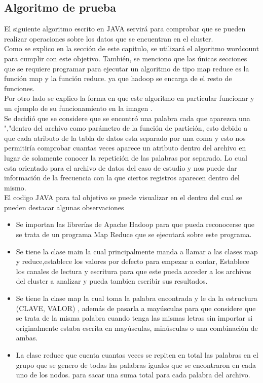 \subsection{Algoritmo de prueba} \label{seccion6}
El siguiente algoritmo escrito en JAVA servirá para comprobar que se pueden realizar operaciones sobre los datos
que se encuentran en el cluster.
\\
Como se explico en la sección  de este capitulo, se utilizará el algoritmo wordcount para cumplir con este objetivo.
También, se menciono que las únicas secciones que se requiere programar para ejecutar un algoritmo de tipo map
reduce es la función map y la función reduce. ya que hadoop se encarga de el resto de funciones.
\\
Por otro lado se explico la forma en que este algoritmo en particular funcionar y un ejemplo de su funcionamiento en
la imagen .
\\
Se decidió que se considere que se encontró una palabra cada que aparezca una ","dentro del archivo como parámetro
de la función de partición, esto debido a que cada atributo de la tabla de datos esta separado por una coma y esto nos
permitiría comprobar cuantas veces aparece un atributo dentro del archivo en lugar de solamente conocer la repetición
de las palabras por separado. Lo cual esta orientado para el archivo de datos del caso de estudio y nos puede dar
información de la frecuencia con la que ciertos registros aparecen dentro del mismo.
\\
El codigo JAVA para tal objetivo se puede visualizar en el 
dentro del cual se pueden destacar algunas observaciones
\begin{itemize}
	\item Se importan las librerías de Apache Hadoop para que pueda reconocerse que se trata de un programa Map Reduce
	que se ejecutará sobre este programa.
	\item Se tiene la clase main la cual principalmente manda a llamar a las clases map y reduce,establece los valores por
	defecto para empezar a contar, Establece los canales de lectura y escritura para que este pueda acceder a los
	archivos del cluster a analizar y pueda tambien escribir sus resultados.
	\item Se tiene la clase map la cual toma la palabra encontrada y le da la estructura (CLAVE, VALOR) , además de
	pasarla a mayúsculas para que considere que se trata de la misma palabra cuando tenga las mismas letras sin
	importar si originalmente estaba escrita en mayúsculas, minúsculas o una combinación de ambas.
	\item La clase reduce que cuenta cuantas veces se repiten en total las palabras en el grupo que se genero de todas las
	palabras iguales que se encontraron en cada uno de los nodos. para sacar una suma total para cada palabra del
	archivo.
\end{itemize}
